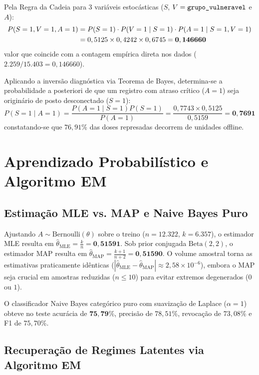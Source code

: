 \documentclass[12pt]{article}
\begin{document}
Pela Regra da Cadeia para 3 variáveis estocásticas ($S$, $V=\text{\texttt{grupo\_vulneravel}}$ e $A$):
\begin{align}
P(S=1, V=1, A=1) &= P(S=1) \cdot P(V=1 \mid S=1) \cdot P(A=1 \mid S=1, V=1) \notag \\
&= 0,5125 \times 0,4242 \times 0,6745 = \mathbf{0,146660}
\end{align}
valor que coincide com a contagem empírica direta nos dados ($2.259 / 15.403 = 0,146660$).

Aplicando a inversão diagnóstica via Teorema de Bayes, determina-se a probabilidade a posteriori de que um registro com atraso crítico ($A=1$) seja originário de posto desconectado ($S=1$):
\begin{equation}
P(S=1 \mid A=1) = \frac{P(A=1 \mid S=1) P(S=1)}{P(A=1)} = \frac{0,7743 \times 0,5125}{0,5159} = \mathbf{0,7691}
\end{equation}
constatando-se que $76,91\%$ das doses represadas decorrem de unidades offline.

\section{Aprendizado Probabilístico e Algoritmo EM}

\subsection{Estimação MLE vs. MAP e Naive Bayes Puro}

Ajustando $A \sim \text{Bernoulli}(\theta)$ sobre o treino ($n = 12.322$, $k = 6.357$), o estimador MLE resulta em $\hat{\theta}_{\text{MLE}} = \frac{k}{n} = \mathbf{0,51591}$. Sob prior conjugada $\text{Beta}(2, 2)$, o estimador MAP resulta em $\hat{\theta}_{\text{MAP}} = \frac{k+1}{n+2} = \mathbf{0,51590}$. O volume amostral torna as estimativas praticamente idênticas ($|\hat{\theta}_{\text{MLE}} - \hat{\theta}_{\text{MAP}}| \approx 2,58 \times 10^{-6}$), embora o MAP seja crucial em amostras reduzidas ($n \le 10$) para evitar extremos degenerados ($0$ ou $1$).

O classificador Naive Bayes categórico puro com suavização de Laplace ($\alpha=1$) obteve no teste acurácia de $\mathbf{75,79\%}$, precisão de $78,51\%$, revocação de $73,08\%$ e F1 de $75,70\%$.

\subsection{Recuperação de Regimes Latentes via Algoritmo EM}
\end{document}
